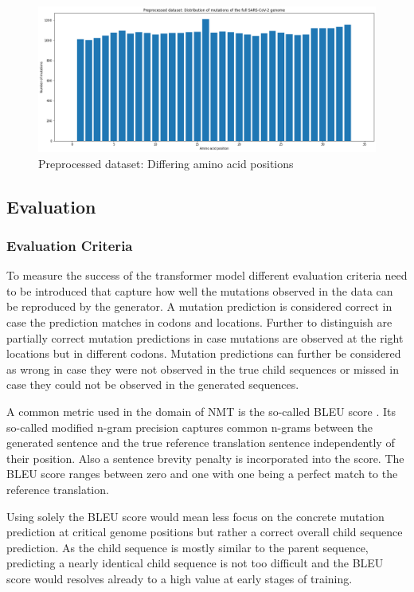 \begin{figure}[ht]
	\centering
	\includegraphics[width=0.9\linewidth]{figures/preprocessedMutatedGeneticLoci.png}
	\caption{Preprocessed dataset: Differing amino acid positions \cite{own representation}}
	\label{preprocessedMutatedGeneticLoci}
\end{figure}

\newpage
\subsection{Evaluation} \label{experimentsB}

\subsubsection{Evaluation Criteria} \label{experimentsBa}

To measure the success of the transformer model different evaluation criteria need to be introduced that capture how well the mutations observed in the data can be reproduced by the generator. A mutation prediction is considered correct in case the prediction matches in codons and locations. Further to distinguish are partially correct mutation predictions in case mutations are observed at the right locations but in different codons. Mutation predictions can further be considered as wrong in case they were not observed in the true child sequences or missed in case they could not be observed in the generated sequences. 

A common metric used in the domain of \ac{NMT} is the so-called \ac{BLEU} score \cite{Papineni2002}. Its so-called modified n-gram precision captures common n-grams between the generated sentence and the true reference translation sentence independently of their position. Also a sentence brevity penalty is incorporated into the score. The \ac{BLEU} score ranges between zero and one with one being a perfect match to the reference translation. \cite{Papineni2002}

Using solely the \ac{BLEU} score would mean less focus on the concrete mutation prediction at critical genome positions but rather a correct overall child sequence prediction. As the child sequence is mostly similar to the parent sequence, predicting a nearly identical child sequence is not too difficult and the \ac{BLEU} score would resolves already to a high value at early stages of training. 


